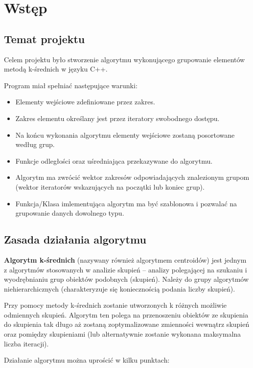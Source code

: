 \section{Wstęp}

\subsection{Temat projektu}

Celem projektu było stworzenie algorytmu wykonującego grupowanie elementów metodą
k-średnich w języku C++.

Program miał spełniać następujące warunki:

\begin{itemize}
	\item Elementy wejściowe zdefiniowane przez zakres.
	\item Zakres elementu określany jest przez iteratory swobodnego dostępu.
	\item Na końcu wykonania algorytmu elementy wejściowe zostaną posortowane według grup.
	\item Funkcje odległości oraz uśredniająca przekazywane do algorytmu.
	\item Algorytm ma zwrócić wektor zakresów odpowiadających znalezionym grupom (wektor iteratorów wskazujących na początki lub koniec grup).
	\item Funkcja/Klasa imlementująca algorytm ma być szablonowa i pozwalać na grupowanie danych dowolnego typu.
\end{itemize}

\subsection{Zasada działania algorytmu}

\textbf{Algorytm k-średnich} (nazywany również algorytmem centroidów) jest jednym z algorytmów stosowanych w analizie skupień --  analizy polegającej na szukaniu i wyodrębnianiu grup obiektów podobnych (skupień). Należy do grupy algorytmów niehierarchicznych (charakteryzuje się koniecznością podania liczby skupień).

Przy pomocy metody k-średnich zostanie utworzonych k różnych możliwie odmiennych skupień. Algorytm ten polega na przenoszeniu obiektów ze skupienia do skupienia tak długo aż zostaną zoptymalizowane zmienności wewnątrz skupień oraz pomiędzy skupieniami (lub alternatywnie zostanie wykonana maksymalna liczba iteracji).

Działanie algorytmu można uprościć w kilku punktach:

